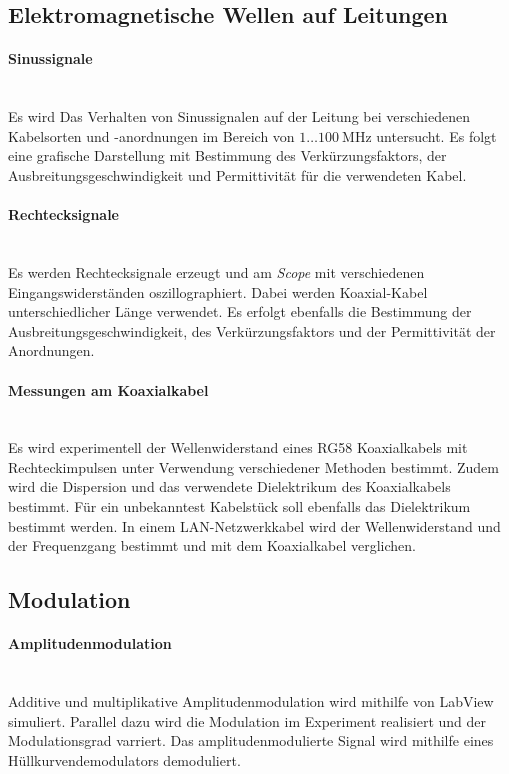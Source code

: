 \documentclass[a4paper,twoside,final]{article}
\begin{document}
\subsection{Elektromagnetische Wellen auf Leitungen}
\paragraph{Sinussignale}$~$\\
Es wird Das Verhalten von Sinussignalen auf der Leitung bei verschiedenen Kabelsorten und -anordnungen im Bereich von $1\hdots\SI{100}{\mega\hertz}$ untersucht. Es folgt eine grafische Darstellung mit Bestimmung des Verkürzungsfaktors, der Ausbreitungsgeschwindigkeit und Permittivität für die verwendeten Kabel.
\paragraph{Rechtecksignale}$~$\\
Es werden Rechtecksignale erzeugt und am \textit{Scope} mit verschiedenen Eingangswiderständen oszillographiert. Dabei werden Koaxial-Kabel unterschiedlicher Länge verwendet. Es erfolgt ebenfalls die Bestimmung der Ausbreitungsgeschwindigkeit, des Verkürzungsfaktors und der Permittivität der Anordnungen.
\paragraph{Messungen am Koaxialkabel}$~$\\
Es wird experimentell der Wellenwiderstand eines RG58 Koaxialkabels mit Rechteckimpulsen unter Verwendung verschiedener Methoden bestimmt. Zudem wird die Dispersion und das verwendete Dielektrikum des Koaxialkabels bestimmt. Für ein unbekanntest Kabelstück soll ebenfalls das Dielektrikum bestimmt werden. In einem LAN-Netzwerkkabel wird der Wellenwiderstand und der Frequenzgang bestimmt und mit dem Koaxialkabel verglichen.

\subsection{Modulation}
\paragraph{Amplitudenmodulation}$~$\\
Additive und multiplikative Amplitudenmodulation wird mithilfe von LabView simuliert. Parallel dazu wird die Modulation im Experiment realisiert und der Modulationsgrad varriert. Das amplitudenmodulierte Signal wird mithilfe eines Hüllkurvendemodulators demoduliert.
\end{document}
